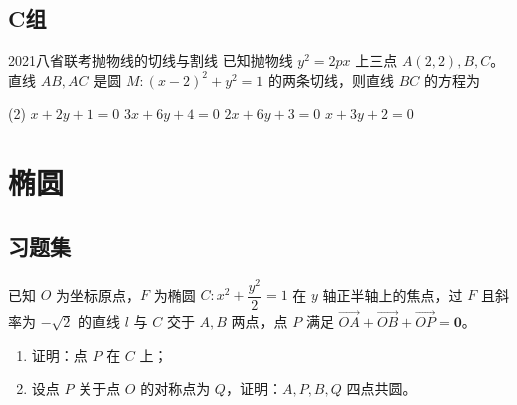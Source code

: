 \subsection*{C组}

\begin{choice}{2021八省联考}{抛物线的切线与割线}
	已知抛物线 $y^2=2px$ 上三点 $A(2,2),B,C$。直线 $AB,AC$ 是圆 $M: (x-2)^2+y^2=1$ 的两条切线，则直线 $BC$ 的方程为
	\begin{tasks}(2)
		\task $x+2y+1=0$
		\task $3x+6y+4=0$
		\task $2x+6y+3=0$
		\task $x+3y+2=0$
	\end{tasks}
\end{choice}

\stopexercise

\section{椭圆}

\startexercise

\subsection*{习题集}

\begin{exercise}[2011大纲卷理]
	已知 $O$ 为坐标原点，$F$ 为椭圆 $C: x^2 + \dfrac{y^2}{2} = 1$ 在 $y$ 轴正半轴上的焦点，过 $F$ 且斜率为 $-\sqrt{2}$ 的直线 $l$ 与 $C$ 交于 $A, B$ 两点，点 $P$ 满足 $\overrightarrow{OA} + \overrightarrow{OB} + \overrightarrow{OP} = \mathbf{0}$。
	\begin{enumerate}
		\item[(1)] 证明：点 $P$ 在 $C$ 上；
		\item[(2)] 设点 $P$ 关于点 $O$ 的对称点为 $Q$，证明：$A, P, B, Q$ 四点共圆。
	\end{enumerate}
\end{exercise}

\stopexercise
